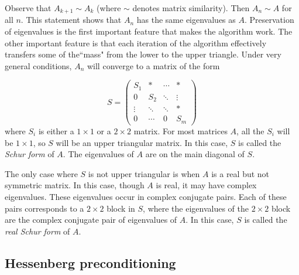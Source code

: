 Observe that $A_{k+1} \sim A_k$ (where $\sim$ denotes matrix similarity).
Then $A_n \sim A$ for all $n$.
This statement shows that $A_n$ has the same eigenvalues as $A$.
Preservation of eigenvalues is the first important feature that makes the algorithm work.
The other important feature is that each iteration of the algorithm effectively transfers some of the``mass" from the lower to the upper triangle.
Under very general conditions, $A_n$ will converge to a matrix of the form

\begin{equation*}
\label{eq:Schur form}
S =
     \begin{pmatrix}
          S_1 &* & \cdots & * \\
           0     &S_2  &  \ddots & \vdots \\
           \vdots  & \ddots & \ddots & *  \\
           0 & \cdots & 0 & S_m
    \end{pmatrix}
\end{equation*}
where $S_i$ is either a $1 \times 1$ or a $2 \times 2$ matrix.
For most matrices $A$, all the $S_i$ will be $1 \times 1$, so $S$ will be an upper triangular matrix.
In this case, $S$ is called the \emph{Schur form} of $A$.
The eigenvalues of $A$ are on the main diagonal of $S$.

The only case where $S$ is not upper triangular is when $A$ is a real but not symmetric matrix.
In this case, though $A$ is real, it may have complex eigenvalues.
These eigenvalues occur in complex conjugate pairs.
Each of these pairs corresponds to a $2 \times 2$ block in $S$, where the eigenvalues of the $2 \times 2$ block are the complex conjugate pair of eigenvalues of $A$.
In this case, $S$ is called the \emph{real Schur form} of $A$.

\subsection*{Hessenberg preconditioning}

